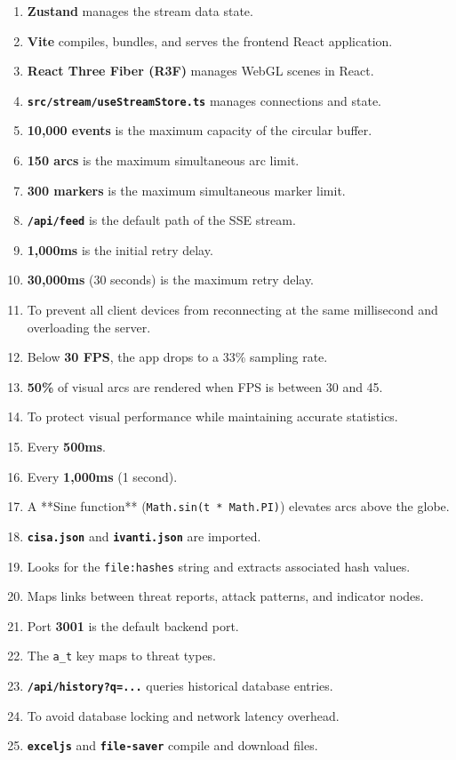 \documentclass[11pt,a4paper]{report}
\begin{document}
\begin{enumerate}
  \item \textbf{Zustand} manages the stream data state.
  \item \textbf{Vite} compiles, bundles, and serves the frontend React application.
  \item \textbf{React Three Fiber (R3F)} manages WebGL scenes in React.
  \item \textbf{\texttt{src/stream/useStreamStore.ts}} manages connections and state.
  \item \textbf{10,000 events} is the maximum capacity of the circular buffer.
  \item \textbf{150 arcs} is the maximum simultaneous arc limit.
  \item \textbf{300 markers} is the maximum simultaneous marker limit.
  \item \textbf{\texttt{/api/feed}} is the default path of the SSE stream.
  \item \textbf{1,000ms} is the initial retry delay.
  \item \textbf{30,000ms} (30 seconds) is the maximum retry delay.
  \item To prevent all client devices from reconnecting at the same millisecond and overloading the server.
  \item Below \textbf{30 FPS}, the app drops to a 33\% sampling rate.
  \item \textbf{50\%} of visual arcs are rendered when FPS is between 30 and 45.
  \item To protect visual performance while maintaining accurate statistics.
  \item Every \textbf{500ms}.
  \item Every \textbf{1,000ms} (1 second).
  \item A **Sine function** (\texttt{Math.sin(t * Math.PI)}) elevates arcs above the globe.
  \item \textbf{\texttt{cisa.json}} and \textbf{\texttt{ivanti.json}} are imported.
  \item Looks for the \texttt{file:hashes} string and extracts associated hash values.
  \item Maps links between threat reports, attack patterns, and indicator nodes.
  \item Port \textbf{3001} is the default backend port.
  \item The \texttt{a\_t} key maps to threat types.
  \item \textbf{\texttt{/api/history?q=...}} queries historical database entries.
  \item To avoid database locking and network latency overhead.
  \item \textbf{\texttt{exceljs}} and \textbf{\texttt{file-saver}} compile and download files.
\end{enumerate}
\end{document}
